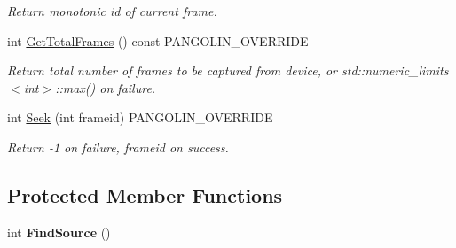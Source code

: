 \begin{DoxyCompactItemize}
\begin{DoxyCompactList}\small\item\em Return monotonic id of current frame. \end{DoxyCompactList}\item 
int \hyperlink{classpangolin_1_1_pango_video_af6c22038f6e41b16f34ca08d7c82fec2}{Get\+Total\+Frames} () const P\+A\+N\+G\+O\+L\+I\+N\+\_\+\+O\+V\+E\+R\+R\+I\+DE
\begin{DoxyCompactList}\small\item\em Return total number of frames to be captured from device, or std\+::numeric\+\_\+limits$<$int$>$\+::max() on failure. \end{DoxyCompactList}\item 
int \hyperlink{classpangolin_1_1_pango_video_a7285cb5a18bcdf1e938dbcdbc9b54b37}{Seek} (int frameid) P\+A\+N\+G\+O\+L\+I\+N\+\_\+\+O\+V\+E\+R\+R\+I\+DE\hypertarget{classpangolin_1_1_pango_video_a7285cb5a18bcdf1e938dbcdbc9b54b37}{}\label{classpangolin_1_1_pango_video_a7285cb5a18bcdf1e938dbcdbc9b54b37}

\begin{DoxyCompactList}\small\item\em Return -\/1 on failure, frameid on success. \end{DoxyCompactList}\end{DoxyCompactItemize}
\subsection*{Protected Member Functions}
\begin{DoxyCompactItemize}
\item 
int {\bfseries Find\+Source} ()\hypertarget{classpangolin_1_1_pango_video_a9b00559cacf5e721d5b0bda29d39d05c}{}\label{classpangolin_1_1_pango_video_a9b00559cacf5e721d5b0bda29d39d05c}

\end{DoxyCompactItemize}
